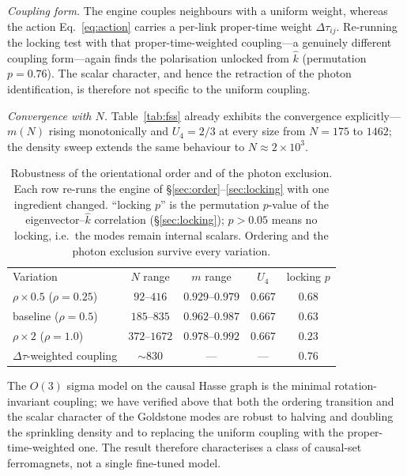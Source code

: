 \documentclass[aps,prd,reprint,nofootinbib,superscriptaddress,floatfix]{revtex4-2}
\begin{document}
\emph{Coupling form.} The engine couples neighbours with a uniform weight, whereas
the action Eq.~\eqref{eq:action} carries a per-link proper-time weight
$\Delta\tau_{ij}$. Re-running the locking test with that proper-time-weighted
coupling---a genuinely different coupling form---again finds the polarisation
unlocked from $\hat k$ (permutation $p=0.76$). The scalar character, and hence the
retraction of the photon identification, is therefore not specific to the uniform
coupling.

\emph{Convergence with $N$.} Table~\ref{tab:fss} already exhibits the convergence
explicitly---$m(N)$ rising monotonically and $U_4=2/3$ at every size from $N=175$ to
$1462$; the density sweep extends the same behaviour to $N\approx2\times10^3$.

\begin{table}[t]
\caption{Robustness of the orientational order and of the photon exclusion. Each row
re-runs the engine of \S\ref{sec:order}--\ref{sec:locking} with one ingredient
changed. ``locking $p$'' is the permutation $p$-value of the eigenvector--$\hat k$
correlation (\S\ref{sec:locking}); $p>0.05$ means no locking, i.e.\ the modes remain
internal scalars. Ordering and the photon exclusion survive every variation.}
\label{tab:robust}
\begin{ruledtabular}
\begin{tabular}{lcccc}
Variation & $N$ range & $m$ range & $U_4$ & locking $p$ \\
\colrule
$\rho\times0.5$ ($\rho{=}0.25$)   & $92$--$416$   & $0.929$--$0.979$ & $0.667$ & $0.68$ \\
baseline ($\rho{=}0.5$)           & $185$--$835$  & $0.962$--$0.987$ & $0.667$ & $0.63$ \\
$\rho\times2$ ($\rho{=}1.0$)      & $372$--$1672$ & $0.978$--$0.992$ & $0.667$ & $0.23$ \\
$\Delta\tau$-weighted coupling    & $\sim\!830$   & ---              & ---     & $0.76$ \\
\end{tabular}
\end{ruledtabular}
\end{table}

The $O(3)$ sigma model on the causal Hasse graph is the minimal rotation-invariant
coupling; we have verified above that both the ordering transition and the scalar
character of the Goldstone modes are robust to halving and doubling the sprinkling
density and to replacing the uniform coupling with the proper-time-weighted one. The
result therefore characterises a class of causal-set ferromagnets, not a single
fine-tuned model.
\end{document}

